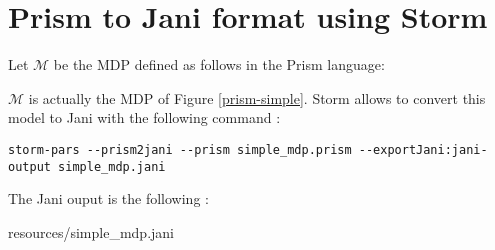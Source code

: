 \section{Prism to Jani format using Storm}\label{prism2jani}
Let $\mathcal{M}$ be the MDP defined as follows in the Prism language:

$\mathcal{M}$ is actually the MDP of Figure \ref{prism-simple}.
Storm allows to convert this model to Jani with the following command :
{\scriptsize
\begin{verbatim}
storm-pars --prism2jani --prism simple_mdp.prism --exportJani:jani-output simple_mdp.jani
\end{verbatim}
}
The Jani ouput is the following :

    {resources/simple_mdp.jani}

